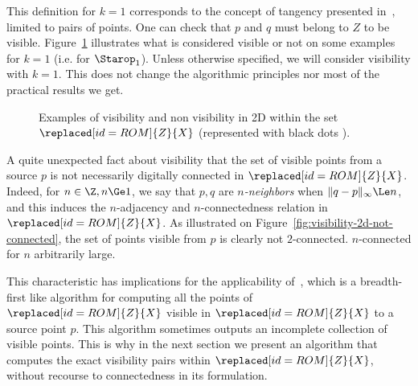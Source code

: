     This definition for $k=1$ corresponds to the concept of tangency
    presented in~\cite{lachaud:2022-jmiv}, limited to pairs of
    points. One can check that $p$ and $q$ must belong to $Z$ to be
    visible.  Figure~\ref{fig:visibility-2d} illustrates what is
    considered visible or not on some examples for $k=1$ (i.e. for
    $\Starop_1$).  Unless otherwise specified, we will consider
    visibility with $k=1$. This does not change the algorithmic
    principles nor most of the practical results we get.

    \begin{figure}[t]
      \centering
      
      \caption{Examples of visibility and non visibility in 2D within
        the set $\replaced[id=ROM]{Z}{X}$ (represented with black dots ).}
      \label{fig:visibility-2d}
    \end{figure}


    A quite unexpected fact about visibility  that the set of
    visible points from a source $p$ is not necessarily digitally
    connected in $\replaced[id=ROM]{Z}{X}$. Indeed, for $n \in \Z, n \Ge 1$, we say that
    $p,q$ are \emph{$n$-neighbors} when $\|q-p\|_\infty \Le n$, and
    this induces the $n$-adjacency and $n$-connectedness relation in
    $\replaced[id=ROM]{Z}{X}$. As illustrated on
    Figure~\ref{fig:visibility-2d-not-connected}, the set of points
    visible from $p$ is clearly not $2$-connected.  $n$-connected
    for $n$ arbitrarily large.

    This characteristic has implications for the applicability of~\cite[Algorithm 3]{lachaud:2022-jmiv}, which is a breadth-first
    like algorithm for computing all the points of $\replaced[id=ROM]{Z}{X}$ visible in $\replaced[id=ROM]{Z}{X}$
    to a source point $p$. This algorithm sometimes outputs an
    incomplete collection of visible points. This is why in the next
    section we present an algorithm that computes the exact visibility
    pairs within $\replaced[id=ROM]{Z}{X}$, without recourse to connectedness in its formulation.


